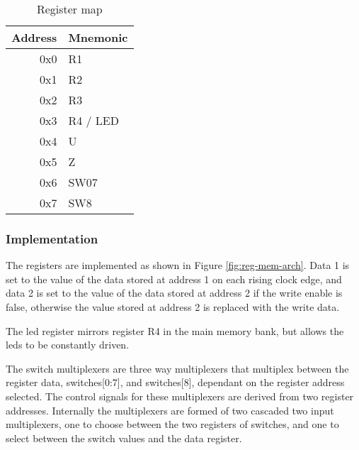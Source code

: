 \begin{table}[ht]
	\centering
	\caption{Register map}
	\label{tbl:reg-map}
	\begin{tabular}{r | l}
		\toprule
		Address & Mnemonic \\
		\midrule
		0x0	& R1 \\
		0x1	& R2 \\
		0x2	& R3 \\
		0x3	& R4 / LED \\
		0x4	& U \\
		0x5	& Z \\
		0x6	& SW07 \\
		0x7	& SW8 \\
		\bottomrule
	\end{tabular}
\end{table}

\subsubsection{Implementation}
The registers are implemented as shown in Figure \ref{fig:reg-mem-arch}. Data 1 is set to the value of the data stored at address 1 on each rising clock edge, and data 2 is set to the value of the data stored at address 2 if the write enable is false, otherwise the value stored at address 2 is replaced with the write data.

The \gls{led} register mirrors register R4 in the main memory bank, but allows the \glspl{led} to be constantly driven.

The switch multiplexers are three way multiplexers that multiplex between the register data, switches[0:7], and switches[8], dependant on the register address selected. The control signals for these multiplexers are derived from two register addresses. Internally the multiplexers are formed of two cascaded two input multiplexers, one to choose between the two registers of switches, and one to select between the switch values and the data register.

